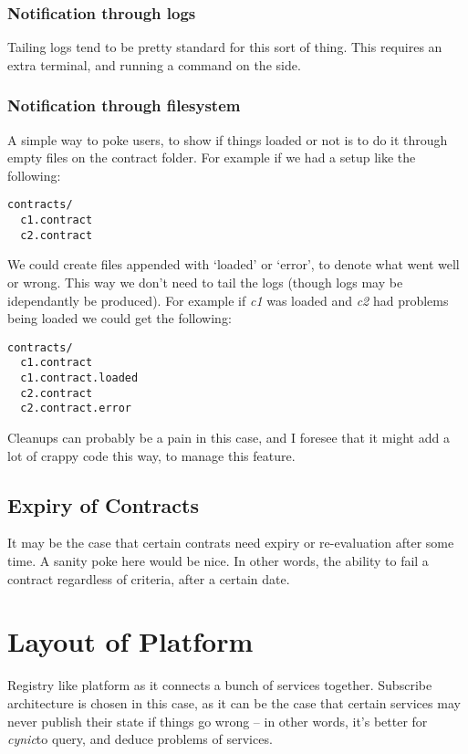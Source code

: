 \documentclass[12pt,twoside]{article}
\newcommand{\projectname}[0]{\textit{cynic}}
\begin{document}
\subsubsection{Notification through logs}
Tailing logs tend to be pretty standard for this sort of thing. This
requires an extra terminal, and running a command on the side.

\subsubsection{Notification through filesystem}
A simple way to poke users, to show if things loaded or not is to do
it through empty files on the contract folder. For example if we had a
setup like the following:

\begin{verbatim}
contracts/
  c1.contract
  c2.contract
\end{verbatim}

We could create files appended with `loaded' or `error', to denote
what went well or wrong. This way we don't need to tail the logs
(though logs may be idependantly be produced). For example if
\textit{c1} was loaded and \textit{c2} had problems being loaded we
could get the following:

\begin{verbatim}
contracts/
  c1.contract
  c1.contract.loaded
  c2.contract
  c2.contract.error
\end{verbatim}

Cleanups can probably be a pain in this case, and I foresee that it
might add a lot of crappy code this way, to manage this feature.

\subsection{Expiry of Contracts}
It may be the case that certain contrats need expiry or re-evaluation
after some time. A sanity poke here would be nice. In other words, the
ability to fail a contract regardless of criteria, after a certain
date.

\section{Layout of Platform}
Registry like platform as it connects a bunch of services
together. Subscribe architecture is chosen in this case, as it can be
the case that certain services may never publish their state if things
go wrong -- in other words, it's better for \projectname to query, and
deduce problems of services.
\end{document}
